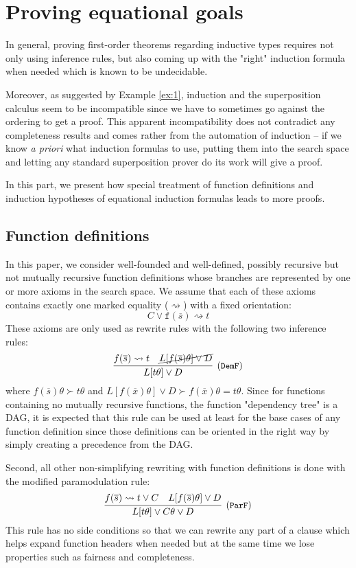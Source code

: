 
\section{Proving equational goals}
In general, proving first-order theorems regarding inductive types requires not only using inference rules, but also coming up with the "right" induction formula when needed which is known to be undecidable.

Moreover, as suggested by Example \ref{ex:1}, induction and the superposition calculus seem to be incompatible since we have to sometimes go against the ordering to get a proof. This apparent incompatibility does not contradict any completeness results and comes rather from the automation of induction -- if we know \textit{a priori} what induction formulas to use, putting them into the search space and letting any standard superposition prover do its work will give a proof.

In this part, we present how special treatment of function definitions and induction hypotheses of equational induction formulas leads to more proofs.

\subsection{Function definitions}
In this paper, we consider well-founded and well-defined, possibly recursive but not mutually recursive function definitions whose branches are represented by one or more axioms in the search space. We assume that each of these axioms contains exactly one marked equality ($\rightsquigarrow$) with a fixed orientation:
$$C\lor \mathtt{f}(\overline{s}) \rightsquigarrow t$$
These axioms are only used as rewrite rules with the following two inference rules:
\begin{equation}
\infer[\small{(\texttt{DemF})}]{L[t\theta]\lor D}
{f(\overline{s})\rightsquigarrow t & \cancel{L[f(\overline{s})\theta]\lor D}}
\end{equation}
where $f(\overline{s})\theta\succ t\theta$ and $L[f(\overline{x})\theta]\lor D\succ f(\overline{x})\theta=t\theta$. Since for functions containing no mutually recursive functions, the function "dependency tree" is a DAG, it is expected that this rule can be used at least for the base cases of any function definition since those definitions can be oriented in the right way by simply creating a precedence from the DAG.

Second, all other non-simplifying rewriting with function definitions is done with the modified paramodulation rule:
\begin{equation}
\infer[\small{(\texttt{ParF})}]{L[t\theta]\lor C\theta\lor D}{f(\overline{s})\rightsquigarrow t\lor C & L[f(\overline{s})\theta]\lor D}
\end{equation}
This rule has no side conditions so that we can rewrite any part of a clause which helps expand function headers when needed but at the same time we lose properties such as fairness and completeness.

